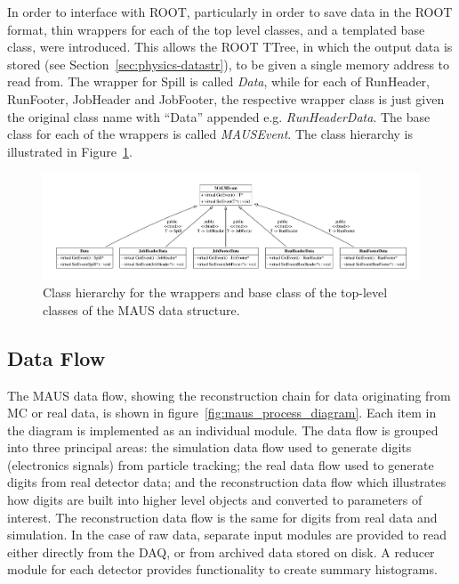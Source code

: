 \documentclass{JINST}
\begin{document}
In order to interface with ROOT, particularly in order to save data in the ROOT format, thin wrappers for each of the top level classes, and a templated base class, were introduced. This allows the ROOT TTree, in which the output data is stored (see Section~\ref{sec:physics-datastr}), to be given a single memory address to read from. The wrapper for Spill is called \emph{Data}, while for each of RunHeader, RunFooter, JobHeader and JobFooter, the respective wrapper class is just given the original class name with ``Data'' appended e.g. \emph{RunHeaderData}. The base class for each of the wrappers is called \emph{MAUSEvent}. The class hierarchy is illustrated in Figure~\ref{fig:top-level}.

\begin{figure}[htb]
\centering
\includegraphics[width=1.03\textwidth]{figs/top_level.pdf}
\caption{Class hierarchy for the wrappers and base class of the top-level classes of the MAUS data structure.}
\label{fig:top-level}
\end{figure}

\subsection{Data Flow}\label{sec:maus-dataflow}

The MAUS data flow, showing the reconstruction chain for data originating from MC or real data, is shown in figure~\ref{fig:maus_process_diagram}. Each item in the diagram is implemented as an individual module. The data flow is grouped into three principal areas: the simulation data flow used to generate digits (electronics signals) from particle tracking; the real data flow used to generate digits from real detector data; and the reconstruction data flow which illustrates how digits are built into higher level objects and converted to parameters of interest. The reconstruction data flow is the same for digits from real data and simulation.  In the case of raw data, separate input modules are provided to read either directly from the DAQ, or from archived data stored on disk. A reducer module for each detector provides functionality to create summary histograms.
\end{document}
